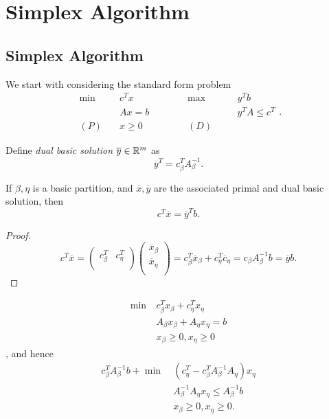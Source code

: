 \chapter{Simplex Algorithm}
\section{Simplex Algorithm}
We start with considering the standard form problem
\[
	\begin{alignedat}{5}
		\min~&c^{T}x\qquad\qquad &&\max ~ &&y^{T}b\\
		&Ax = b && &&y^{T}A\leq c^{T}\\
		(P)\quad&x\geq  0 &&(D)\quad&&
	\end{alignedat}.
\]

\begin{definition}
	Define \emph{dual basic solution} \(\overline{y}\in \mathbb{\MakeUppercase{R}}^m\) as
	\[
		\overline{y}^{T} = c_{\beta}^{T} A^{-1}_{\beta}.
	\]
\end{definition}

\begin{lemma}
	If \(\beta, \eta\) is a basic partition, and \(\overline{x}, \overline{y}\) are the associated primal and dual basic solution,
	then
	\[
		c^{T}\overline{x} = \overline{y}^{T} b.
	\]
\end{lemma}
\begin{proof}
	\[
		c^{T}\overline{x} = \begin{pmatrix}
			c^{T}_{\beta} & c^{T}_{\eta} \\
		\end{pmatrix}\begin{pmatrix}
			\overline{x}_{\beta} \\
			\overline{x}_{\eta}  \\
		\end{pmatrix}= c_{\beta}^{T} \overline{x}_{\beta}+ c_{\eta}^{T} \overline{c}_{\eta} = c_{\beta} A^{-1}_{\beta}b = \overline{y}b.
	\]
\end{proof}

\begin{prev}
	\begin{align*}
		\min~ & c^{T}_{\beta}x_{\beta} + c^{T}_{\eta}x_{\eta} \\
		      & A_{\beta}x_{\beta} + A_{\eta}x_{\eta} = b     \\
		      & x_{\beta}\geq 0, x_{\eta}\geq 0
	\end{align*}, and hence
	\begin{align*}
		c^{T}_{\beta}A^{-1}_{\beta}b + \min~ & (c_{\eta}^{T} - c_{\beta}^{T}A^{-1}_{\beta}A_{\eta})x_{\eta} \\
		                                     & A^{-1}_{\beta}A_{\eta}x_{\eta} \leq A^{-1}_{\beta}b          \\
		                                     & x_{\beta}\geq 0, x_{\eta}\geq 0.
	\end{align*}
\end{prev}

